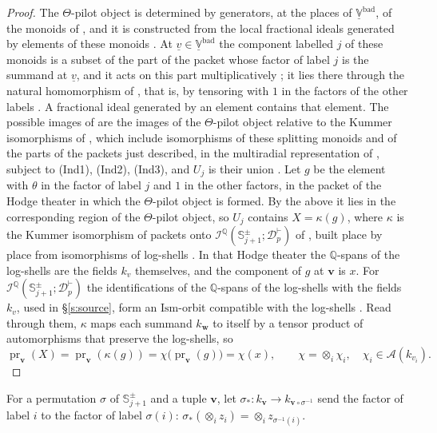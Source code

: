 \documentclass[11pt]{amsart}
\theoremstyle{remark}
\newcommand{\Q}{\mathbb Q}
\newcommand{\cA}{\mathcal A}
\newcommand{\cI}{\mathcal I}
\newcommand{\Vbad}{\underline{\mathbb V}^{\mathrm{bad}}}
\newcommand{\pr}{\operatorname{pr}}
\newcommand{\Sj}{\mathbb S^{\pm}_{j+1}}
\newcommand{\Dp}{\mathcal D^{\vdash}_{p}}
\newcommand{\bv}{\mathbf v}
\newcommand{\bw}{\mathbf w}
\begin{document}
\begin{proof}
The $\Theta$-pilot object is determined by generators, at the places of $\Vbad$, of the monoids of
\cite[Def.~3.8(i), p.~112]{IUT3}, and it is constructed from the local fractional ideals generated by elements of
these monoids \cite[Prop.~3.7(v), p.~112]{IUT3}. At $\underline v\in\Vbad$ the component labelled $j$ of these
monoids is a subset of the part of the packet whose factor of label $j$ is the summand at $\underline v$, and it acts
on this part multiplicatively \cite[Prop.~3.4(ii), pp.~102--103]{IUT3}; it lies there through the natural
homomorphism of \cite[Prop.~3.4(i)]{IUT3}, that is, by tensoring with $1$ in the factors of the other labels
\cite[Prop.~3.1(ii), p.~93]{IUT3}. A fractional ideal generated by an element contains that element. The possible
images of \cite[Cor.~3.12]{IUT3} are the images of the $\Theta$-pilot object relative to the Kummer isomorphisms of
\cite[Thm.~3.11(ii), p.~155]{IUT3}, which include isomorphisms of these splitting monoids and of the parts of the
packets just described, in the multiradial representation of \cite[Thm.~3.11(i)]{IUT3}, subject to (Ind1), (Ind2),
(Ind3), and $U_j$ is their union \cite[pp.~173--174]{IUT3}. Let $g$ be the element with $\theta$ in the factor of
label $j$ and $1$ in the other factors, in the packet of the Hodge theater in which the $\Theta$-pilot object is
formed. By the above it lies in the corresponding region of the $\Theta$-pilot object, so $U_j$ contains
$X=\kappa(g)$, where $\kappa$ is the Kummer isomorphism of packets onto $\cI^{\Q}(\Sj;\Dp)$ of
\cite[Thm.~3.11(ii)(a)]{IUT3}, built place by place from isomorphisms of log-shells \cite[Prop.~3.2]{IUT3}. In that
Hodge theater the $\Q$-spans of the log-shells are the fields $k_v$ themselves, and the component of $g$ at $\bv$ is
$x$. For $\cI^{\Q}(\Sj;\Dp)$ the identifications of the $\Q$-spans of the log-shells with the fields $k_v$, used in
\S\ref{s:source}, form an $\mathrm{Ism}$-orbit compatible with the log-shells \cite[Prop.~1.2(vi), p.~32]{IUT3}. Read
through them, $\kappa$ maps each summand $k_{\bw}$ to itself by a tensor product of automorphisms that preserve the
log-shells, so
\[
\pr_{\bv}(X)=\pr_{\bv}(\kappa(g))=\chi\bigl(\pr_{\bv}(g)\bigr)=\chi(x),\qquad\chi=\otimes_i\chi_i,\quad
\chi_i\in\cA(k_{v_i}).
\]
\end{proof}

For a permutation $\sigma$ of $\Sj$ and a tuple $\bv$, let $\sigma_*\colon k_{\bv}\to k_{\bv\circ\sigma^{-1}}$ send the
factor of label $i$ to the factor of label $\sigma(i)$: $\sigma_*(\otimes_i z_i)=\otimes_i z_{\sigma^{-1}(i)}$.
\end{document}

